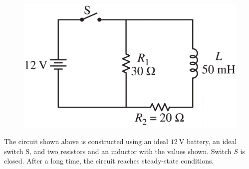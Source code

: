 %
\begin{figure}[H]
\centering
\includegraphics[scale=0.3]{images/img-025-039.png}
\end{figure}


\question
The circuit shown above is constructed using an ideal $12 \mathrm{~V}$ battery, an ideal switch $\mathrm{S}$, and two resistors and an inductor with the values shown. Switch $S$ is closed. After a long time, the circuit reaches steady-state conditions. %

